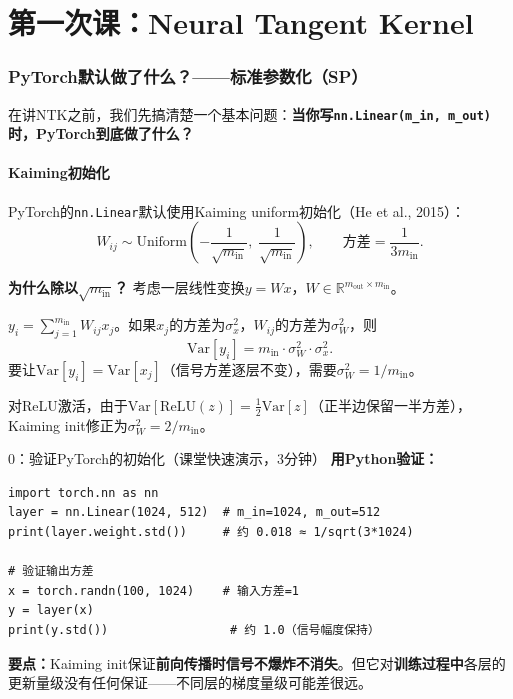 \documentclass[11pt,a4paper]{article}
\newcommand{\R}{\mathbb{R}}
\begin{document}
\part{第一次课：Neural Tangent Kernel}

\section{PyTorch默认做了什么？——标准参数化（SP）}

在讲NTK之前，我们先搞清楚一个基本问题：\textbf{当你写\texttt{nn.Linear(m\_in, m\_out)}时，PyTorch到底做了什么？}

\subsection{Kaiming初始化}

PyTorch的\texttt{nn.Linear}默认使用Kaiming uniform初始化（He et al., 2015）：
\[
W_{ij}\sim\text{Uniform}\!\left(-\frac{1}{\sqrt{m_{\text{in}}}},\; \frac{1}{\sqrt{m_{\text{in}}}}\right), \qquad \text{方差}=\frac{1}{3m_{\text{in}}}.
\]

\textbf{为什么除以$\sqrt{m_{\text{in}}}$？} 考虑一层线性变换$y=Wx$，$W\in\R^{m_{\text{out}}\times m_{\text{in}}}$。

$y_i = \sum_{j=1}^{m_{\text{in}}} W_{ij}x_j$。如果$x_j$的方差为$\sigma_x^2$，$W_{ij}$的方差为$\sigma_W^2$，则
\[
\text{Var}[y_i] = m_{\text{in}}\cdot\sigma_W^2\cdot\sigma_x^2.
\]
要让$\text{Var}[y_i]=\text{Var}[x_j]$（信号方差逐层不变），需要$\sigma_W^2 = 1/m_{\text{in}}$。

对ReLU激活，由于$\text{Var}[\text{ReLU}(z)]=\frac{1}{2}\text{Var}[z]$（正半边保留一半方差），Kaiming init修正为$\sigma_W^2=2/m_{\text{in}}$。

\begin{handcalc}{0：验证PyTorch的初始化（课堂快速演示，3分钟）}
\textbf{用Python验证：}
\begin{verbatim}
import torch.nn as nn
layer = nn.Linear(1024, 512)  # m_in=1024, m_out=512
print(layer.weight.std())     # 约 0.018 ≈ 1/sqrt(3*1024)

# 验证输出方差
x = torch.randn(100, 1024)    # 输入方差=1
y = layer(x)
print(y.std())                 # 约 1.0（信号幅度保持）
\end{verbatim}
\tcblower
\textbf{要点：}Kaiming init保证\textbf{前向传播时信号不爆炸不消失}。但它对\textbf{训练过程中}各层的更新量级没有任何保证——不同层的梯度量级可能差很远。
\end{handcalc}
\end{document}
